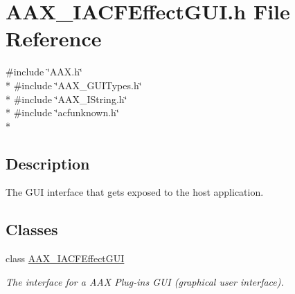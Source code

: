\hypertarget{a00223}{}\section{A\+A\+X\+\_\+\+I\+A\+C\+F\+Effect\+G\+U\+I.\+h File Reference}
\label{a00223}
{\ttfamily \#include \char`\"{}A\+A\+X.\+h\char`\"{}}\\*
{\ttfamily \#include \char`\"{}A\+A\+X\+\_\+\+G\+U\+I\+Types.\+h\char`\"{}}\\*
{\ttfamily \#include \char`\"{}A\+A\+X\+\_\+\+I\+String.\+h\char`\"{}}\\*
{\ttfamily \#include \char`\"{}acfunknown.\+h\char`\"{}}\\*


\subsection{Description}
The G\+U\+I interface that gets exposed to the host application. 

\subsection*{Classes}
\begin{DoxyCompactItemize}
\item 
class \hyperlink{a00060}{A\+A\+X\+\_\+\+I\+A\+C\+F\+Effect\+G\+U\+I}
\begin{DoxyCompactList}\small\item\em The interface for a A\+A\+X Plug-\/in\textquotesingle{}s G\+U\+I (graphical user interface). \end{DoxyCompactList}\end{DoxyCompactItemize}
